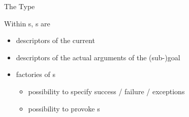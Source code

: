 \documentclass[handout]{beamer}
\begin{document}
\begin{frame}[allowframebreaks]{The  Type}
    \framebreak

    \begin{block}{Within s, s are}
        \begin{itemize}
            \item descriptors of the \alert{current} 
            \item descriptors of the \alert{actual} arguments of the (sub-)goal
            \item factories of s
            \begin{itemize}
                \item possibility to specify \alert{success} / \alert{failure} / \alert{exceptions}
                \item possibility to provoke \alert{}s
            \end{itemize}
        \end{itemize}
    \end{block}
\end{frame}
\end{document}
